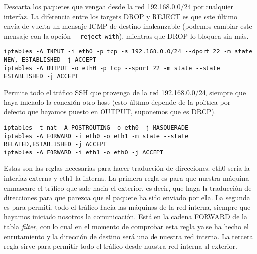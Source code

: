 Descarta los paquetes que vengan desde la red 192.168.0.0/24 por cualquier interfaz. La diferencia entre los targets DROP y REJECT es que este último envía de vuelta un mensaje ICMP de destino inalcanzable (podemos cambiar este mensaje con la opción \hspace{0.7cm} \lstinline!--reject-with!), mientras que DROP lo bloquea sin más.\\

\begin{lstlisting}
iptables -A INPUT -i eth0 -p tcp -s 192.168.0.0/24 --dport 22 -m state NEW, ESTABLISHED -j ACCEPT
iptables -A OUTPUT -o eth0 -p tcp --sport 22 -m state --state ESTABLISHED -j ACCEPT
\end{lstlisting}

Permite todo el tráfico SSH que provenga de la red 192.168.0.0/24, siempre que haya iniciado la conexión otro host (esto último depende de la política por defecto que hayamos puesto en OUTPUT, suponemos que es DROP).\\

\begin{lstlisting}
iptables -t nat -A POSTROUTING -o eth0 -j MASQUERADE
iptables -A FORWARD -i eth0 -o eth1 -m state --state RELATED,ESTABLISHED -j ACCEPT
iptables -A FORWARD -i eth1 -o eth0 -j ACCEPT
\end{lstlisting}

Estas son las reglas necesarias para hacer traducción de direcciones. eth0 sería la interfaz externa y eth1 la interna. La primera regla es para que nuestra máquina enmascare el tráfico que sale hacia el exterior, es decir, que haga la traducción de direcciones para que parezca que el paquete ha sido enviado por ella. La segunda es para permitir todo el tráfico hacia las máquinas de la red interna, siempre que hayamos iniciado nosotros la comunicación. Está en la cadena FORWARD de la tabla \textit{filter}, con lo cual en el momento de comprobar esta regla ya se ha hecho el enrutamiento y la dirección de destino será una de nuestra red interna. La tercera regla sirve para permitir todo el tráfico desde nuestra red interna al exterior.

%
